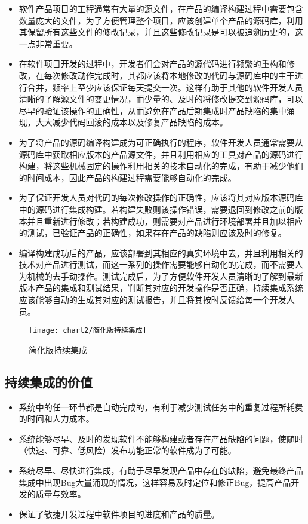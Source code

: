 	\begin{itemize}
		\item 软件产品项目的工程通常有大量的源文件，在产品的编译构建过程中需要包含数量庞大的文件，为了方便管理整个项目，应该创建单个产品的源码库，利用其保留所有这些文件的修改记录，并且这些修改记录是可以被追溯历史的，这一点非常重要。
		\item 在软件项目开发的过程中，开发者们会对产品的源代码进行频繁的重构和修改，在每次修改动作完成时，其都应该将本地修改的代码与源码库中的主干进行合并，频率上至少应该保证每天提交一次。这样有助于其他的软件开发人员清晰的了解源文件的变更情况，而少量的、及时的将修改提交到源码库，可以尽早的验证该操作的正确性，从而避免在产品后期集成时产品缺陷的集中涌现，大大减少代码回滚的成本以及修复产品缺陷的成本。
		\item 为了将产品的源码编译构建成为可正确执行的程序，软件开发人员通常需要从源码库中获取相应版本的产品源文件，并且利用相应的工具对产品的源码进行构建，将这些机械固定的操作利用相关的技术自动化的完成，有助于减少他们的时间成本，因此产品的构建过程需要能够自动化的完成。
		\item 为了保证开发人员对代码的每次修改操作的正确性，应该将其对应版本源码库中的源码进行集成构建。若构建失败则该操作错误，需要退回到修改之前的版本并且重新进行修改；若构建成功，则需要对产品进行环境部署并且加以相应的测试，已验证产品的正确性，如果存在产品的缺陷则应该及时的修复。
		\item 编译构建成功后的产品，应该部署到其相应的真实环境中去，并且利用相关的技术对产品进行测试，而这一系列的操作需要能够自动化的完成，而不需要人为机械的去手动操作。测试完成后，为了方便软件开发人员清晰的了解到最新版本产品的集成和测试结果，判断其对应的开发操作是否正确，持续集成系统应该能够自动的生成其对应的测试报告，并且将其按时反馈给每一个开发人员。
	\end{itemize}
	
	\begin{figure}[H] %
		\centering
		\texttt{[image: chart2/简化版持续集成]}
		\caption{简化版持续集成}
		\label{fig:简化版持续集成}
	\end{figure}
	
\subsection{持续集成的价值}

	\begin{itemize}
		\item 系统中的任一环节都是自动完成的，有利于减少测试任务中的重复过程所耗费的时间和人力成本。
		\item 系统能够尽早、及时的发现软件不能够构建或者存在产品缺陷的问题，使随时（快速、可靠、低风险）发布功能正常的软件成为了可能。
		\item 系统尽早、尽快进行集成，有助于尽早发现产品中存在的缺陷，避免最终产品集成中出现Bug大量涌现的情况，这样容易及时定位和修正Bug，提高产品开发的质量与效率。
		\item 保证了敏捷开发过程中软件项目的进度和产品的质量。
	\end{itemize}
	
